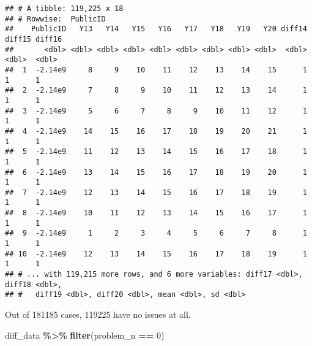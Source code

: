 \documentclass[
]{article}
\newenvironment{Shaded}{\begin{snugshade}}{\end{snugshade}}
\newcommand{\DataTypeTok}[1]{\textcolor[rgb]{0.13,0.29,0.53}{#1}}
\newcommand{\DecValTok}[1]{\textcolor[rgb]{0.00,0.00,0.81}{#1}}
\newcommand{\KeywordTok}[1]{\textcolor[rgb]{0.13,0.29,0.53}{\textbf{#1}}}
\newcommand{\NormalTok}[1]{#1}
\newcommand{\OperatorTok}[1]{\textcolor[rgb]{0.81,0.36,0.00}{\textbf{#1}}}
\newcommand{\StringTok}[1]{\textcolor[rgb]{0.31,0.60,0.02}{#1}}
\begin{document}
\begin{verbatim}
## # A tibble: 119,225 x 18
## # Rowwise:  PublicID
##    PublicID   Y13   Y14   Y15   Y16   Y17   Y18   Y19   Y20 diff14 diff15 diff16
##       <dbl> <dbl> <dbl> <dbl> <dbl> <dbl> <dbl> <dbl> <dbl>  <dbl>  <dbl>  <dbl>
##  1  -2.14e9     8     9    10    11    12    13    14    15      1      1      1
##  2  -2.14e9     7     8     9    10    11    12    13    14      1      1      1
##  3  -2.14e9     5     6     7     8     9    10    11    12      1      1      1
##  4  -2.14e9    14    15    16    17    18    19    20    21      1      1      1
##  5  -2.14e9    11    12    13    14    15    16    17    18      1      1      1
##  6  -2.14e9    13    14    15    16    17    18    19    20      1      1      1
##  7  -2.14e9    12    13    14    15    16    17    18    19      1      1      1
##  8  -2.14e9    10    11    12    13    14    15    16    17      1      1      1
##  9  -2.14e9     1     2     3     4     5     6     7     8      1      1      1
## 10  -2.14e9    12    13    14    15    16    17    18    19      1      1      1
## # ... with 119,215 more rows, and 6 more variables: diff17 <dbl>, diff18 <dbl>,
## #   diff19 <dbl>, diff20 <dbl>, mean <dbl>, sd <dbl>
\end{verbatim}

Out of 181185 cases, 119225 have no issues at all.

\begin{Shaded}
\end{Shaded}

\begin{Shaded}
\begin{Highlighting}[]
\NormalTok{diff\_data }\OperatorTok{\%\textgreater{}\%}\StringTok{ }\KeywordTok{filter}\NormalTok{(problem\_n }\OperatorTok{==}\StringTok{ }\DecValTok{0}\NormalTok{)}
\end{Highlighting}
\end{Shaded}
\end{document}
